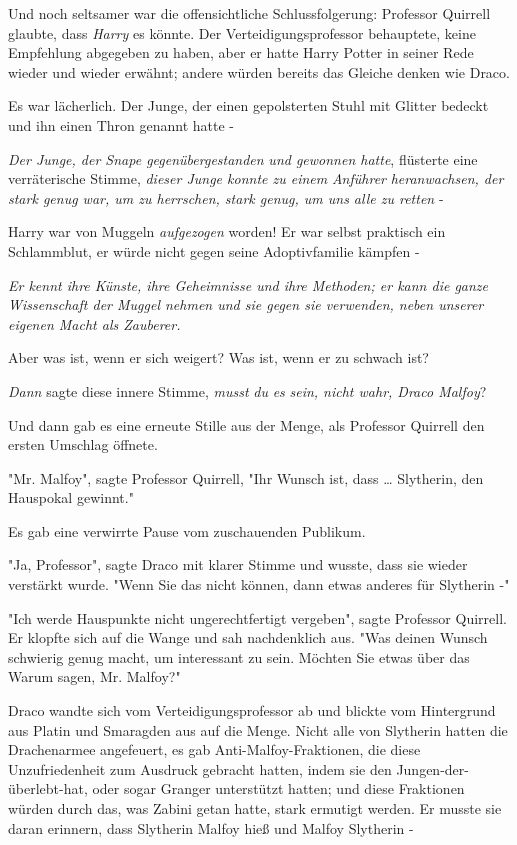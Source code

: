 {Und noch seltsamer war die offensichtliche Schlussfolgerung: Professor Quirrell glaubte, dass \emph{Harry} es könnte. Der Verteidigungsprofessor behauptete, keine Empfehlung abgegeben zu haben, aber er hatte Harry Potter in seiner Rede wieder und wieder erwähnt; andere würden bereits das Gleiche denken wie Draco.

Es war lächerlich. Der Junge, der einen gepolsterten Stuhl mit Glitter bedeckt und ihn einen Thron genannt hatte -

\emph{Der Junge, der Snape gegenübergestanden} \emph{und gewonnen hatte}, flüsterte eine verräterische Stimme, \emph{dieser Junge konnte zu einem} \emph{Anführer} \emph{heranwachsen, der stark genug war, um zu herrschen, stark genug, um uns alle zu retten} -

Harry war von Muggeln \emph{aufgezogen} worden! Er war selbst praktisch ein Schlammblut, er würde nicht gegen seine Adoptivfamilie kämpfen -

\emph{\emph{Er kennt ihre Künste, ihre Geheimnisse und ihre Methoden; er kann die ganze Wissenschaft der Muggel nehmen und sie gegen sie verwenden, neben unserer eigenen Macht als Zauberer.}}

Aber was ist, wenn er sich weigert? Was ist, wenn er zu schwach ist?

\emph{Dann} sagte diese innere Stimme, \emph{musst} \emph{du} \emph{es} \emph{sein, nicht wahr, Draco Malfoy}?

Und dann gab es eine erneute Stille aus der Menge, als Professor Quirrell den ersten Umschlag öffnete.

"Mr. Malfoy", sagte Professor Quirrell, "Ihr Wunsch ist, dass … Slytherin, den Hauspokal gewinnt."

Es gab eine verwirrte Pause vom zuschauenden Publikum.

"Ja, Professor", sagte Draco mit klarer Stimme und wusste, dass sie wieder verstärkt wurde. "Wenn Sie das nicht können, dann etwas anderes für Slytherin -"

"Ich werde Hauspunkte nicht ungerechtfertigt vergeben", sagte Professor Quirrell. Er klopfte sich auf die Wange und sah nachdenklich aus. "Was deinen Wunsch schwierig genug macht, um interessant zu sein. Möchten Sie etwas über das Warum sagen, Mr. Malfoy?"

Draco wandte sich vom Verteidigungsprofessor ab und blickte vom Hintergrund aus Platin und Smaragden aus auf die Menge. Nicht alle von Slytherin hatten die Drachenarmee angefeuert, es gab Anti-Malfoy-Fraktionen, die diese Unzufriedenheit zum Ausdruck gebracht hatten, indem sie den Jungen-der-überlebt-hat, oder sogar Granger unterstützt hatten; und diese Fraktionen würden durch das, was Zabini getan hatte, stark ermutigt werden. Er musste sie daran erinnern, dass Slytherin Malfoy hieß und Malfoy Slytherin -

}
